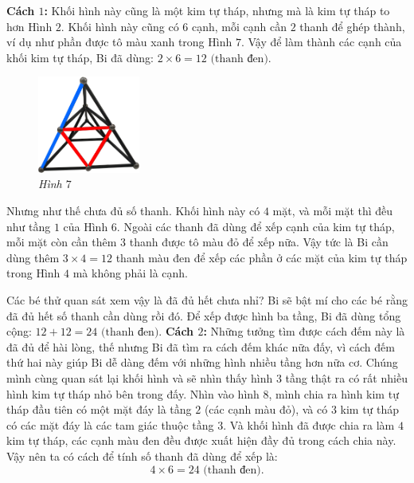 	\vskip 0.1cm
	\textbf{Cách $1$:} Khối hình này cũng là một kim tự tháp, nhưng mà là kim tự tháp to hơn Hình $2$. Khối hình này cũng có $6$ cạnh, mỗi cạnh cần $2$  thanh để ghép thành, ví dụ như phần được tô màu xanh trong Hình $7$. Vậy để làm thành các cạnh của khối kim tự tháp, Bi đã dùng:
	$ 2\times 6 = 12 \text{ (thanh đen)}.$
	\begin{multicols}{2}
		\begin{figure}[H]
			\centering
			\vspace*{5pt}
			\captionsetup{labelformat= empty, justification=centering} \includegraphics[width=0.3\textwidth]{7}
			\caption{\small\textit{Hình $7$}}
			\vspace*{-10pt}
		\end{figure}
		Nhưng như thế chưa đủ số thanh. Khối hình này có $4$ mặt, và mỗi mặt thì đều như tầng $1$ của Hình $6$. Ngoài các thanh đã dùng để xếp cạnh của kim tự tháp, mỗi mặt còn cần thêm $3$ thanh được tô màu đỏ để xếp nữa. Vậy tức là Bi cần dùng thêm $3 \times 4 = 12$ thanh màu đen để xếp các phần ở các mặt của kim tự tháp trong Hình $4$ mà không phải là cạnh.
	\end{multicols}
	\vskip 0.1cm
	Các bé thử quan sát xem vậy là đã đủ hết chưa nhỉ? Bi sẽ bật mí cho các bé rằng đã đủ hết số  thanh cần dùng rồi đó. Để xếp được hình ba tầng, Bi đã dùng tổng cộng:
	$ 12 + 12 = 24 \text{ (thanh đen)}.$
	\vskip 0.1cm
	\textbf{Cách $2$:} Những tưởng tìm được cách đếm này là đã đủ để hài lòng, thế nhưng Bi đã tìm ra cách đếm khác nữa đấy, vì cách đếm thứ hai này giúp Bi dễ dàng đếm với những hình nhiều tầng hơn nữa cơ.
	\vskip 0.1cm
	Chúng mình cùng quan sát lại khối hình và sẽ nhìn thấy hình $3$ tầng thật ra có rất nhiều hình kim tự tháp nhỏ bên trong đấy. Nhìn vào hình $8$, mình chia ra hình kim tự tháp đầu tiên có một mặt đáy là tầng $2$ (các cạnh màu đỏ), và có $3$ kim tự tháp có các mặt đáy là các tam giác thuộc tầng $3$. Và khối hình đã được chia ra làm $4$ kim tự tháp, các cạnh màu đen đều được xuất hiện đầy đủ trong cách chia này. Vậy nên ta có cách để tính số thanh đã dùng để xếp là: 
	$$4 \times 6 = 24 \text{ (thanh đen)}.$$	
